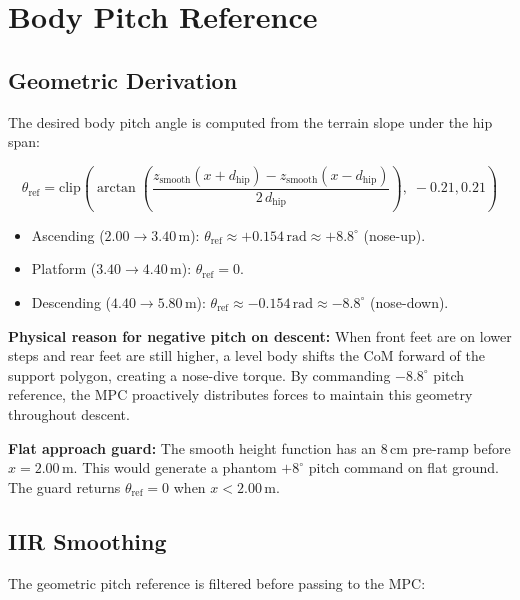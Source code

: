 \documentclass[12pt,a4paper]{report}
\begin{document}
\section{Body Pitch Reference}

\subsection{Geometric Derivation}

The desired body pitch angle is computed from the terrain slope under the hip
span:

\begin{equation}
    \theta_\text{ref} = \text{clip}\!\left(
        \arctan\!\left(\frac{z_\text{smooth}(x + d_\text{hip}) - z_\text{smooth}(x - d_\text{hip})}
                             {2\,d_\text{hip}}\right),\;
        -0.21, 0.21\right)
    \label{eq:pitch_ref}
\end{equation}

\begin{itemize}[noitemsep]
  \item Ascending ($2.00 \to 3.40\,\text{m}$): $\theta_\text{ref} \approx +0.154\,\text{rad} \approx +8.8^\circ$ (nose-up).
  \item Platform ($3.40 \to 4.40\,\text{m}$): $\theta_\text{ref} = 0$.
  \item Descending ($4.40 \to 5.80\,\text{m}$): $\theta_\text{ref} \approx -0.154\,\text{rad} \approx -8.8^\circ$ (nose-down).
\end{itemize}

\textbf{Physical reason for negative pitch on descent:}  When front feet
are on lower steps and rear feet are still higher, a level body shifts the CoM
forward of the support polygon, creating a nose-dive torque.  By commanding
$-8.8^\circ$ pitch reference, the MPC proactively distributes forces to
maintain this geometry throughout descent.

\textbf{Flat approach guard:}  The smooth height function has an $8\,\text{cm}$
pre-ramp before $x = 2.00\,\text{m}$.  This would generate a phantom
$+8^\circ$ pitch command on flat ground.  The guard returns $\theta_\text{ref} = 0$
when $x < 2.00\,\text{m}$.

\subsection{IIR Smoothing}

The geometric pitch reference is filtered before passing to the MPC:
\end{document}
